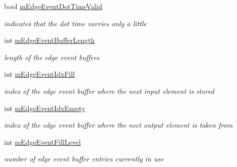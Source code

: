 \begin{DoxyCompactItemize}
\mbox{\label{classMorseDecode_ac8d4d251b441b0a799d6747a1fa546e7}} 
bool \hyperlink{classMorseDecode_ac8d4d251b441b0a799d6747a1fa546e7}{m\+Edge\+Event\+Dot\+Time\+Valid}
\begin{DoxyCompactList}\small\item\em indicates that the dot time varries only a little \end{DoxyCompactList}\item 
\mbox{\label{classMorseDecode_aaa89555443f5a6e49f1eae02b040908f}} 
int \hyperlink{classMorseDecode_aaa89555443f5a6e49f1eae02b040908f}{m\+Edge\+Event\+Buffer\+Length}
\begin{DoxyCompactList}\small\item\em length of the edge event buffers \end{DoxyCompactList}\item 
\mbox{\label{classMorseDecode_a7ce9cac5747a2460f36b408ee0246866}} 
int \hyperlink{classMorseDecode_a7ce9cac5747a2460f36b408ee0246866}{m\+Edge\+Event\+Idx\+Fill}
\begin{DoxyCompactList}\small\item\em index of the edge event buffer where the next input element is stored \end{DoxyCompactList}\item 
\mbox{\label{classMorseDecode_a0202013d5e417bc12f332242b3b96293}} 
int \hyperlink{classMorseDecode_a0202013d5e417bc12f332242b3b96293}{m\+Edge\+Event\+Idx\+Empty}
\begin{DoxyCompactList}\small\item\em index of the edge event buffer where the nect output element is taken from \end{DoxyCompactList}\item 
\mbox{\label{classMorseDecode_a435d08a4f5e4898f00694cbeb35fc704}} 
int \hyperlink{classMorseDecode_a435d08a4f5e4898f00694cbeb35fc704}{m\+Edge\+Event\+Fill\+Level}
\begin{DoxyCompactList}\small\item\em number of edge event buffer entries currently in use \end{DoxyCompactList}\item 
\mbox{\label{classMorseDecode_aced6dc0c7d2a22a246e40bd99a8d4fd4}} 

\end{DoxyCompactItemize}
